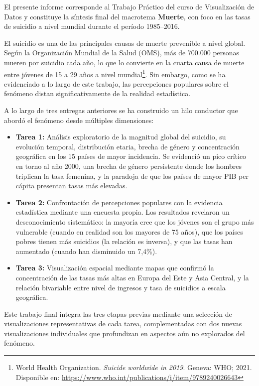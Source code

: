 \documentclass[12pt, letterpaper]{article}
\begin{document}
El presente informe corresponde al Trabajo Pr\'actico del curso de Visualizaci\'on de Datos y constituye la s\'intesis final del macrotema \textbf{Muerte}, con foco en las tasas de suicidio a nivel mundial durante el per\'iodo 1985--2016.

El suicidio es una de las principales causas de muerte prevenible a nivel global. Seg\'un la Organizaci\'on Mundial de la Salud (OMS), m\'as de 700.000 personas mueren por suicidio cada a\~no, lo que lo convierte en la cuarta causa de muerte entre j\'ovenes de 15 a 29 a\~nos a nivel mundial\footnote{World Health Organization. \textit{Suicide worldwide in 2019}. Geneva: WHO; 2021. Disponible en: \url{https://www.who.int/publications/i/item/9789240026643}}. Sin embargo, como se ha evidenciado a lo largo de este trabajo, las percepciones populares sobre el fen\'omeno distan significativamente de la realidad estad\'istica.

A lo largo de tres entregas anteriores se ha construido un hilo conductor que abord\'o el fen\'omeno desde m\'ultiples dimensiones:

\begin{itemize}[nosep]
  \item \textbf{Tarea 1:} An\'alisis exploratorio de la magnitud global del suicidio, su evoluci\'on temporal, distribuci\'on etaria, brecha de g\'enero y concentraci\'on geogr\'afica en los 15 pa\'ises de mayor incidencia. Se evidenci\'o un pico cr\'itico en torno al a\~no 2000, una brecha de g\'enero persistente donde los hombres triplican la tasa femenina, y la paradoja de que los pa\'ises de mayor PIB per c\'apita presentan tasas m\'as elevadas.
  \item \textbf{Tarea 2:} Confrontaci\'on de percepciones populares con la evidencia estad\'istica mediante una encuesta propia. Los resultados revelaron un desconocimiento sistem\'atico: la mayor\'ia cree que los j\'ovenes son el grupo m\'as vulnerable (cuando en realidad son los mayores de 75 a\~nos), que los pa\'ises pobres tienen m\'as suicidios (la relaci\'on es inversa), y que las tasas han aumentado (cuando han disminuido un 7,4\%).
  \item \textbf{Tarea 3:} Visualizaci\'on espacial mediante mapas que confirm\'o la concentraci\'on de las tasas m\'as altas en Europa del Este y Asia Central, y la relaci\'on bivariable entre nivel de ingresos y tasa de suicidios a escala geogr\'afica.
\end{itemize}

Este trabajo final integra las tres etapas previas mediante una selecci\'on de visualizaciones representativas de cada tarea, complementadas con dos nuevas visualizaciones individuales que profundizan en aspectos a\'un no explorados del fen\'omeno.
\end{document}
